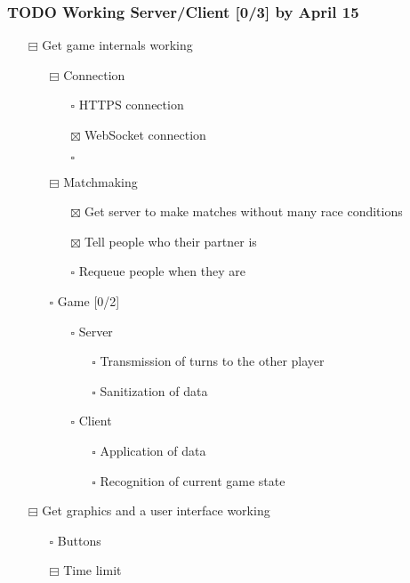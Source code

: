 \documentclass[11pt]{article}
\begin{document}
\subsubsection{{\bfseries\sffamily TODO} Working Server/Client [0/3] by April 15}
\label{sec:org19f5dfe}
\begin{itemize}
\item[{$\boxminus$}] Get game internals working
\begin{itemize}
\item[{$\boxminus$}] Connection
\begin{itemize}
\item[{$\square$}] HTTPS connection
\item[{$\boxtimes$}] WebSocket connection
\item[{$\square$}] 
\end{itemize}
\item[{$\boxminus$}] Matchmaking
\begin{itemize}
\item[{$\boxtimes$}] Get server to make matches without many race conditions
\item[{$\boxtimes$}] Tell people who their partner is
\item[{$\square$}] Requeue people when they are
\end{itemize}
\item[{$\square$}] Game [0/2]
\begin{itemize}
\item[{$\square$}] Server
\begin{itemize}
\item[{$\square$}] Transmission of turns to the other player
\item[{$\square$}] Sanitization of data
\end{itemize}
\item[{$\square$}] Client
\begin{itemize}
\item[{$\square$}] Application of data
\item[{$\square$}] Recognition of current game state
\end{itemize}
\end{itemize}
\end{itemize}
\item[{$\boxminus$}] Get graphics and a user interface working
\begin{itemize}
\item[{$\square$}] Buttons
\item[{$\boxminus$}] Time limit
\begin{itemize}

\end{itemize}
\end{itemize}
\end{itemize}
\end{document}
